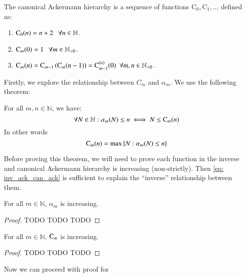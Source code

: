 \begin{defn} \label{defn: can_ack_hier}
The canonical Ackermann hierarchy is a sequence of functions $\text{C}_0, \text{C}_1, \ldots $ defined as:
\begin{enumerate}
	\item $\text{C}_0(n) = n + 2 \ \ \ \forall n\in \mathbb{N}$.
	\item $\text{C}_m(0) = 1 \ \ \ \forall m\in\mathbb{N}_{>0}$.
	\item $\text{C}_m(n) = \text{C}_{m-1}\left(\text{C}_m(n-1)\right) = \text{C}_{m-1}^{(n)}(0) \ \ \forall m, n\in \mathbb{N}_{>0}$.
\end{enumerate}
\end{defn}

Firstly, we explore the relationship between $C_m$ and $\alpha_m$. We use the following theorem:

\begin{thm} \label{thm: inv_ack_can_ack}
For all $m, n \in \mathbb{N}$, we have:
\begin{equation} \label{eq: inv_ack_can_ack}
\forall N \in \mathbb{N}: \alpha_m(N) \le n \iff N \le \text{C}_m(n)
\end{equation}
In other words
\begin{equation} \label{eq: inv_ack_can_ack_0}
\text{C}_m(n) = \max\left\{N : \alpha_m(N) \le n\right\}
\end{equation}
\end{thm}

Before proving this theorem, we will need to prove each function in the inverse and canonical Ackermann hierarchy is increasing (non-strictly). Then \eqref{eq: inv_ack_can_ack} is sufficient to explain the ``inverse'' relationship between them.

\begin{lem} \label{lem: inv_ack_hier_incr}
For all $m\in \mathbb{N}$, $\alpha_m$ is increasing.
\end{lem}

\begin{proof}
TODO TODO TODO
\end{proof}

\begin{lem}
For all $m\in \mathbb{N}$, $\text{C}_m$ is increasing.
\end{lem}

\begin{proof}
TODO TODO TODO
\end{proof}

Now we can proceed with proof for 

